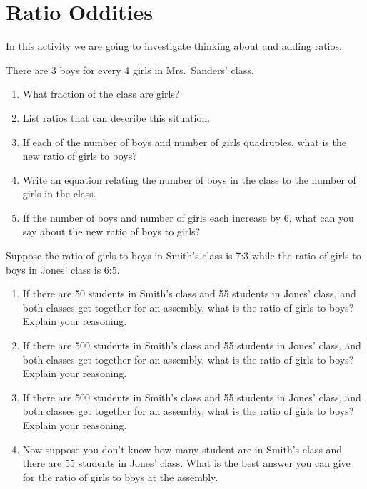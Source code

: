 \newpage
\section{Ratio Oddities}

In this activity we are going to investigate thinking about and adding
ratios.

\begin{prob}
There are 3 boys for every 4 girls in Mrs.\ Sanders' class.
\begin{enumerate}
\item What fraction of the class are girls? 
\item List ratios that can describe this situation. 
\item If each of the number of boys and number of girls quadruples, what is the new ratio of girls to boys?
\item Write an equation relating the number of boys in the class to the number of girls in the class.
\item If the number of boys and number of girls each increase by 6, what can you say about the new ratio of boys to girls?
\end{enumerate}
\end{prob}

\begin{prob}\label{AP:C1}
Suppose the ratio of girls to boys in Smith's class is 7:3 while the
ratio of girls to boys in Jones' class is 6:5.  
\begin{enumerate}
\item If there are 50 students in Smith's class and 55 students in Jones' class, and both
classes get together for an assembly, what is the ratio of girls to
boys? Explain your reasoning.
\item If there are 500 students in Smith's class and 55 students in Jones' class, and both
classes get together for an assembly, what is the ratio of girls to
boys? Explain your reasoning.
\item If there are 500 students in Smith's class and 55 students in Jones' class, and both
classes get together for an assembly, what is the ratio of girls to
boys? Explain your reasoning.
\item Now suppose you don't know how many student are in Smith's class and there are 55 students in Jones' class. What is the best answer you can give for the ratio of girls to boys at the assembly. 
\end{enumerate}
\end{prob}


